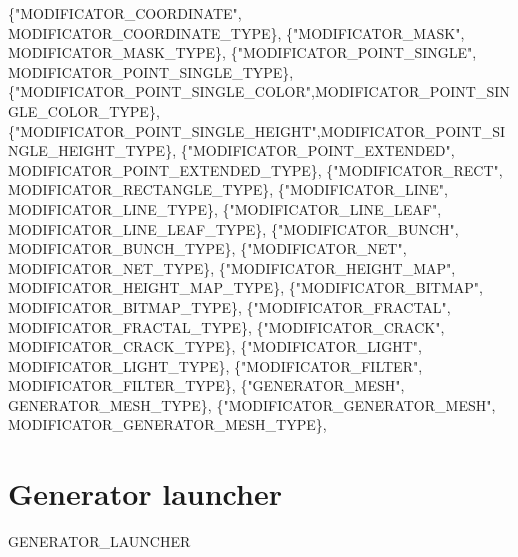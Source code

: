 \documentclass[11pt]{article}
\begin{document}
  \{"MODIFICATOR\_COORDINATE",      MODIFICATOR\_COORDINATE\_TYPE\},
  \{"MODIFICATOR\_MASK",            MODIFICATOR\_MASK\_TYPE\},  
  \{"MODIFICATOR\_POINT\_SINGLE",    MODIFICATOR\_POINT\_SINGLE\_TYPE\},
  \{"MODIFICATOR\_POINT\_SINGLE\_COLOR",MODIFICATOR\_POINT\_SINGLE\_COLOR\_TYPE\},
  \{"MODIFICATOR\_POINT\_SINGLE\_HEIGHT",MODIFICATOR\_POINT\_SINGLE\_HEIGHT\_TYPE\},
  \{"MODIFICATOR\_POINT\_EXTENDED",  MODIFICATOR\_POINT\_EXTENDED\_TYPE\},
  \{"MODIFICATOR\_RECT",            MODIFICATOR\_RECTANGLE\_TYPE\},
  \{"MODIFICATOR\_LINE",            MODIFICATOR\_LINE\_TYPE\},
  \{"MODIFICATOR\_LINE\_LEAF",       MODIFICATOR\_LINE\_LEAF\_TYPE\},
  \{"MODIFICATOR\_BUNCH",           MODIFICATOR\_BUNCH\_TYPE\},
  \{"MODIFICATOR\_NET",             MODIFICATOR\_NET\_TYPE\},
  \{"MODIFICATOR\_HEIGHT\_MAP",      MODIFICATOR\_HEIGHT\_MAP\_TYPE\},
  \{"MODIFICATOR\_BITMAP",          MODIFICATOR\_BITMAP\_TYPE\},
  \{"MODIFICATOR\_FRACTAL",         MODIFICATOR\_FRACTAL\_TYPE\},
  \{"MODIFICATOR\_CRACK",           MODIFICATOR\_CRACK\_TYPE\},
  \{"MODIFICATOR\_LIGHT",           MODIFICATOR\_LIGHT\_TYPE\},
  \{"MODIFICATOR\_FILTER",          MODIFICATOR\_FILTER\_TYPE\},
  \{"GENERATOR\_MESH",              GENERATOR\_MESH\_TYPE\},
  \{"MODIFICATOR\_GENERATOR\_MESH",  MODIFICATOR\_GENERATOR\_MESH\_TYPE\},
  
\section{Generator launcher}

  GENERATOR\_LAUNCHER
\end{document}

